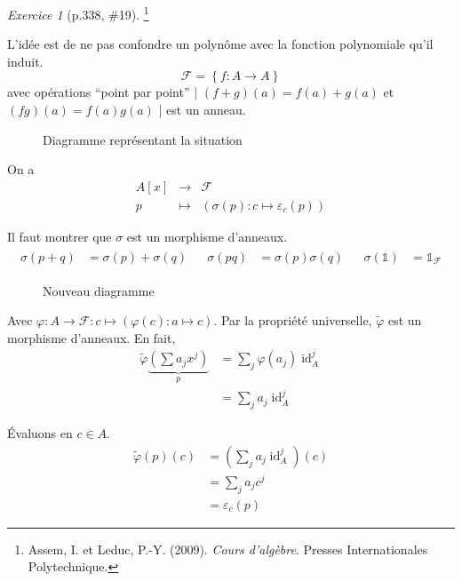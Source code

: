 \documentclass{report}
\theoremstyle{definition}
\theoremstyle{remark}
\newtheorem*{exer}{Exercice}
\def\id{\mathds{1}}
\def\iden{\operatorname{id}}
\begin{document}
	\begin{exer}[p.338, \#19]\footnote{Assem, I. et Leduc, P.-Y. (2009). \textit{Cours d'algèbre}. Presses Internationales Polytechnique.}

		L'id\'ee est de ne pas confondre un polyn\^ome avec la fonction polynomiale qu'il induit.
		\[ \mathscr{F} = \left\{ f:A\to A \right\} \] avec op\'erations ``point par point'' | $(f+g)(a)=f(a)+g(a)$ et $(fg)(a)=f(a)g(a)$ | est un anneau.

		\begin{figure}[h]
			\centering
			\caption{Diagramme repr\'esentant la situation}
		\end{figure}

		On a \[ \begin{array}{rcl}
			A[x]&\to&\mathscr{F}\\
			p&\mapsto&\left( \sigma(p):c\mapsto\varepsilon_c(p) \right)
		\end{array} \]

		Il faut montrer que $\sigma$ est un morphisme d'anneaux.
		\begin{align*}
			\begin{split}
				\sigma(p+q)&= \sigma(p)+\sigma(q)
			\end{split}
			&
			\begin{split}
				\sigma(pq)&= \sigma(p)\sigma(q)
			\end{split}
			&
			\begin{split}
				\sigma(\id)&= \id_{\mathscr{F}}
			\end{split}
		\end{align*}

		\begin{figure}[h]
			\centering
			\caption{Nouveau diagramme}
		\end{figure}

		Avec $\varphi : A\to\mathscr{F} : c\mapsto(\varphi(c):a\mapsto c)$. Par la propri\'et\'e universelle, $\widetilde{\varphi}$ est un morphisme d'anneaux. En fait,
		\begin{align*}
			\widetilde{\varphi}\underbrace{\left(\sum a_jx^j\right)}_{p}&= \sum_j\varphi(a_j)\iden_A^j\\
			&= \sum_ja_j\iden_A^j
		\end{align*}

		\'Evaluons en $c\in A$.
		\begin{align*}
			\widetilde{\varphi}(p)(c)&= \left(\sum_ja_j\iden_A^j\right)(c)\\
			&= \sum_ja_jc^j\\
			&= \varepsilon_c(p)
		\end{align*}
	\end{exer}
\end{document}
